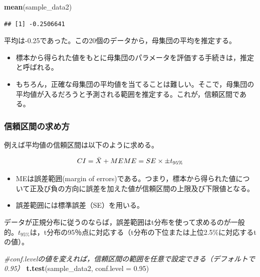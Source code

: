 \documentclass[]{article}
\newenvironment{Shaded}{\begin{snugshade}}{\end{snugshade}}
\newcommand{\KeywordTok}[1]{\textcolor[rgb]{0.13,0.29,0.53}{\textbf{#1}}}
\newcommand{\DataTypeTok}[1]{\textcolor[rgb]{0.13,0.29,0.53}{#1}}
\newcommand{\FloatTok}[1]{\textcolor[rgb]{0.00,0.00,0.81}{#1}}
\newcommand{\CommentTok}[1]{\textcolor[rgb]{0.56,0.35,0.01}{\textit{#1}}}
\newcommand{\NormalTok}[1]{#1}
\providecommand{\tightlist}{%
  \setlength{\itemsep}{0pt}\setlength{\parskip}{0pt}}
\begin{document}
\begin{Shaded}
\begin{Highlighting}[]
\KeywordTok{mean}\NormalTok{(sample_data2)}
\end{Highlighting}
\end{Shaded}

\begin{verbatim}
## [1] -0.2506641
\end{verbatim}

平均は-0.25であった。この20個のデータから，母集団の平均を推定する。

\begin{itemize}
\tightlist
\item
  標本から得られた値をもとに母集団のパラメータを評価する手続きは，推定と呼ばれる。\\
\item
  もちろん，正確な母集団の平均値を当てることは難しい。そこで，母集団の平均値が入るだろうと予測される範囲を推定する。これが，信頼区間である。
\end{itemize}

\subsubsection{信頼区間の求め方}

例えば平均値の信頼区間は以下のように求める。

\[
CI = \bar{X} + ME\\
ME =  SE \times \pm t_{95\%} 
\]

\begin{itemize}
\tightlist
\item
  MEは誤差範囲(margin of
  errors)である。つまり，標本から得られた値について正及び負の方向に誤差を加えた値が信頼区間の上限及び下限値となる。
\item
  誤差範囲には標準誤差（SE）を用いる。
\end{itemize}

データが正規分布に従うのならば，誤差範囲はt分布を使って求めるのが一般的。\(t_{95\%}\)は，t分布の95％点に対応する（t分布の下位または上位2.5\%に対応するtの値）。

\begin{Shaded}
\begin{Highlighting}[]
\CommentTok{#conf.levelの値を変えれば，信頼区間の範囲を任意で設定できる（デフォルトで0.95）}
\KeywordTok{t.test}\NormalTok{(sample_data2, }\DataTypeTok{conf.level =} \FloatTok{0.95}\NormalTok{)}
\end{Highlighting}
\end{Shaded}
\end{document}
